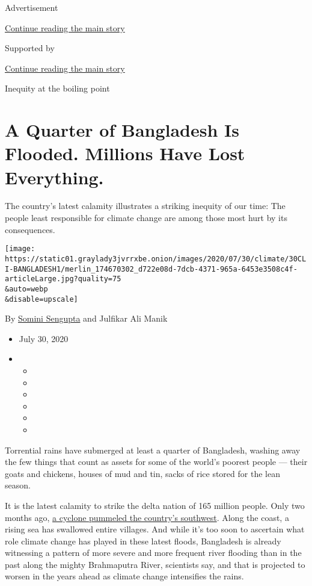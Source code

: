 Advertisement

\protect\hyperlink{after-top}{Continue reading the main story}

Supported by

\protect\hyperlink{after-sponsor}{Continue reading the main story}

Inequity at the boiling point

\hypertarget{a-quarter-of-bangladesh-is-flooded-millions-have-lost-everything}{%
\section{A Quarter of Bangladesh Is Flooded. Millions Have Lost
Everything.}\label{a-quarter-of-bangladesh-is-flooded-millions-have-lost-everything}}

The country's latest calamity illustrates a striking inequity of our
time: The people least responsible for climate change are among those
most hurt by its consequences.

\texttt{[image: https://static01.graylady3jvrrxbe.onion/images/2020/07/30/climate/30CLI-BANGLADESH1/merlin\_174670302\_d722e08d-7dcb-4371-965a-6453e3508c4f-articleLarge.jpg?quality=75\\\&auto=webp\\\&disable=upscale]}

By \href{https://www.nytimes3xbfgragh.onion/by/somini-sengupta}{Somini
Sengupta} and Julfikar Ali Manik

\begin{itemize}
\item
  July 30, 2020
\item
  \begin{itemize}
  \item
  \item
  \item
  \item
  \item
  \item
  \end{itemize}
\end{itemize}

Torrential rains have submerged at least a quarter of Bangladesh,
washing away the few things that count as assets for some of the world's
poorest people --- their goats and chickens, houses of mud and tin,
sacks of rice stored for the lean season.

It is the latest calamity to strike the delta nation of 165 million
people. Only two months ago,
\href{https://www.nytimes3xbfgragh.onion/2020/05/20/world/asia/cyclone-amphan-india-bangladesh.html}{a
cyclone pummeled the country's southwest}. Along the coast, a rising sea
has swallowed entire villages. And while it's too soon to ascertain what
role climate change has played in these latest floods, Bangladesh is
already witnessing a pattern of more severe and more frequent river
flooding than in the past along the mighty Brahmaputra River, scientists
say, and that is projected to worsen in the years ahead as climate
change intensifies the rains.

